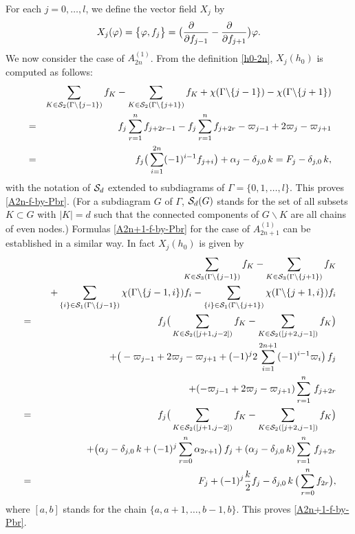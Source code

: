 \begin{pf}
For each $j=0,\ldots,l$, we define the vector field $X_j$ by
\begin{equation}
X_j(\varphi)=\big\{{ \varphi,f_j }\big\}
=\big(\frac{\partial\quad}{\partial f_{j-1}}-\frac{\partial\quad}{\partial f_{j+1}}\big)
\varphi. 
\end{equation}
We now consider the case of $A^{(1)}_{2n}$.
From the definition \eqref{h0-2n}, $X_j(h_0)$ is computed as follows:
\allowdisplaybreaks
\begin{eqnarray*}
&&\sum_{K\in {\cal S}_2(\Gamma\backslash\{j-1\})} f_K
-\sum_{K\in {\cal S}_2(\Gamma\backslash\{j+1\})} f_K
+\chi(\Gamma\backslash\{j-1\})-\chi(\Gamma\backslash\{j+1\})
\notag\\
&=&f_j\sum_{r=1}^{n}f_{j+2r-1}-f_{j}\sum_{r=1}^n f_{j+2r}
-\varpi_{j-1}+2\varpi_j-\varpi_{j+1}
\notag
\\
&=&f_j\big(\sum_{i=1}^{2n} (-1)^{i-1}f_{j+i}\big)+\alpha_j-\delta_{j,0}\, k
=F_j-\delta_{j,0}\, k,
\notag
\end{eqnarray*} 
with the notation of ${\cal S}_d$ extended to subdiagrams of 
$\Gamma=\{0,1,\ldots,l\}$.  This proves \eqref{A2n-f-by-Pbr}.
(For a subdiagram $G$ of $\Gamma$, ${\cal S}_d(G)$ stands for the set of all 
subsets $K\subset G$ with $|K|=d$ such that the connected components of $G\backslash K$
are all chains of even nodes.)
Formulas \eqref{A2n+1-f-by-Pbr} for the case of $A^{(1)}_{2n+1}$ can 
be established in a similar way. 
In fact $X_j(h_0)$ is given by 
\allowdisplaybreaks
\begin{eqnarray*}
\allowdisplaybreaks
&&\sum_{K\in{\cal S}_3(\Gamma\backslash\{j-1\})} f_K
-\sum_{K\in{\cal S}_3(\Gamma\backslash\{j+1\})} f_K
\notag\\*
&&\quad
+\sum_{\{i\}\in{\cal S}_1(\Gamma\backslash\{j-1\})} \chi(\Gamma\backslash\{j-1,i\})f_i
-\sum_{\{i\}\in{\cal S}_1(\Gamma\backslash\{j+1\})} \chi(\Gamma\backslash\{j+1,i\})f_i
\notag\\
&=&f_j\big(\sum_{K\in{\cal S}_2([j+1,j-2])}f_K
-\sum_{K\in{\cal S}_2([j+2,j-1])}f_K
\big)
\notag\\
&&\quad
+\big(-\varpi_{j-1}+2\varpi_j-\varpi_{j+1}+
 (-1)^j 2\sum_{i=1}^{2n+1}(-1)^{i-1}\varpi_{i}\big)\, f_j
\notag\\
&&\quad
+(-\varpi_{j-1}+2\varpi_j-\varpi_{j+1})\sum_{r=1}^{n}\,f_{j+2r}
\notag\\
&=&f_j\big(\sum_{K\in{\cal S}_2([j+1,j-2])}f_K
-\sum_{K\in{\cal S}_2([j+2,j-1])}f_K
\big)
\notag\\
&&\quad
+\big(\alpha_j-\delta_{j,0}\, k +
 (-1)^j \sum_{r=0}^{n}\alpha_{2r+1}\big)\, f_j
+(\alpha_j-\delta_{j,0}\, k)\sum_{r=1}^{n}\,f_{j+2r}
\notag\\
&=&F_j+(-1)^j \frac{k}{2}f_j-\delta_{j,0}\,k\,\big(\sum_{r=0}^n f_{2r}\big),
\notag
\end{eqnarray*}
where $[a,b]$ stands for the chain $\{a,a+1,\ldots,b-1,b\}$. 
This proves \eqref{A2n+1-f-by-Pbr}.
\end{pf}

